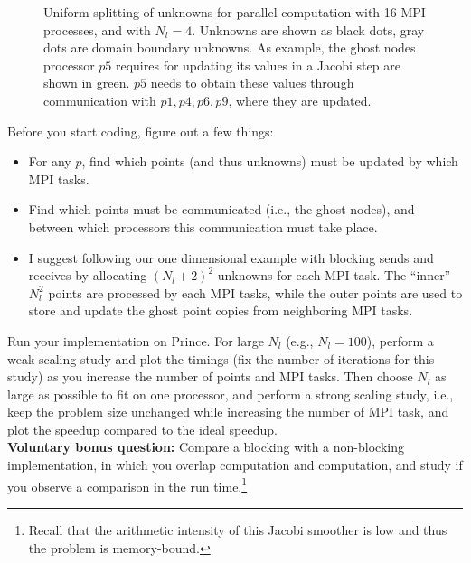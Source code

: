 \documentclass[12pt]{article}
\begin{document}
\begin{enumerate}
\begin{figure}[bht]
 \hspace{5ex}
\caption{Uniform splitting of unknowns for parallel computation with
  16 MPI processes, and with $N_l=4$. Unknowns are shown as black
  dots, gray dots are domain boundary unknowns. As example, the ghost
  nodes processor $p5$ requires for updating its values in a Jacobi
  step are shown in green. $p5$ needs to obtain these values through
  communication with $p1,p4,p6,p9$, where they are
  updated.\label{fig}}
\end{figure}
  Before you start coding, figure out a few things:
  \begin{itemize}
    \item For any $p$, find which points (and thus unknowns) must be
      updated by which MPI tasks.
    \item Find which points must be communicated (i.e., the ghost nodes), and between which
      processors this communication must take place.
    \item I suggest following our one dimensional example with blocking
      sends and receives by allocating $(N_l+2)^2$ unknowns for each
      MPI task. The ``inner'' $N_l^2$ points are processed by each MPI
      tasks, while the outer points are used to store and update the
      ghost point copies from neighboring MPI tasks.
  \end{itemize}
Run your implementation on Prince. For large $N_l$ (e.g.,
$N_l=100$), perform a weak scaling study and plot the timings (fix the
number of iterations for this study) as you increase the number of
points and MPI tasks. Then choose $N_l$ as large as possible to fit on
one processor, and perform a strong scaling study, i.e., keep the
problem size unchanged while increasing the number of MPI task, and
plot the speedup compared to the ideal speedup.\\ {\bf Voluntary bonus
  question:} Compare a blocking with a non-blocking implementation, in
which you overlap computation and computation, and study if you
observe a comparison in the run time.\footnote{%
  Recall that the arithmetic intensity of this Jacobi smoother is low
  and thus the problem is memory-bound.}



\end{enumerate}
\end{document}
